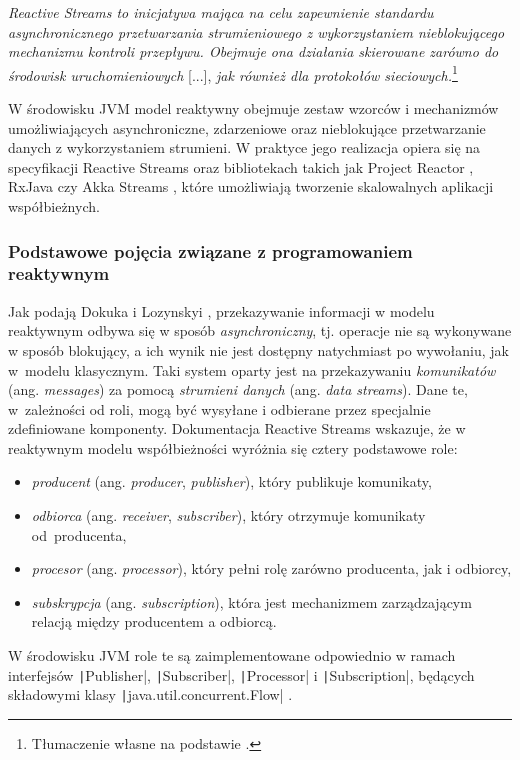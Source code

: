\begin{displayquote}
    \emph{Reactive Streams to inicjatywa mająca na celu zapewnienie standardu asynchronicznego przetwarzania strumieniowego z wykorzystaniem nieblokującego mechanizmu kontroli przepływu. Obejmuje ona działania skierowane zarówno do środowisk uruchomieniowych} [...], \emph{jak również dla protokołów sieciowych.}\footnote{Tłumaczenie własne na podstawie \cite{reactive-streams-page}.}
\end{displayquote}

W środowisku JVM model reaktywny obejmuje zestaw wzorców i mechanizmów umożliwiających asynchroniczne, zdarzeniowe oraz nieblokujące przetwarzanie danych z wykorzystaniem strumieni. W praktyce jego realizacja opiera się na specyfikacji Reactive Streams oraz bibliotekach takich jak Project Reactor \cite{project-reactor-page}, RxJava \cite{rx-java-page} czy Akka Streams \cite{akka-streams-page}, które umożliwiają tworzenie skalowalnych aplikacji współbieżnych.

\subsubsection{Podstawowe pojęcia związane z programowaniem reaktywnym}

Jak podają Dokuka i Lozynskyi \cite{dokuka2018}, przekazywanie informacji w modelu reaktywnym odbywa się w sposób \emph{asynchroniczny}, tj. operacje nie są wykonywane w sposób blokujący, a ich wynik nie jest dostępny natychmiast po wywołaniu, jak w~modelu klasycznym. Taki system oparty jest na przekazywaniu \emph{komunikatów} (ang. \emph{messages}) za pomocą \emph{strumieni danych} (ang. \emph{data streams}). Dane te, w~zależności od roli, mogą być wysyłane i odbierane przez specjalnie zdefiniowane komponenty. Dokumentacja Reactive Streams \cite{reactive-streams-page} wskazuje, że w reaktywnym modelu współbieżności wyróżnia się cztery podstawowe role:
\begin{itemize}
    \item \emph{producent} (ang. \emph{producer}, \emph{publisher}), który publikuje komunikaty,
    \item \emph{odbiorca} (ang. \emph{receiver}, \emph{subscriber}), który otrzymuje komunikaty od~producenta,
    \item \emph{procesor} (ang. \emph{processor}), który pełni rolę zarówno producenta, jak i odbiorcy,
    \item \emph{subskrypcja} (ang. \emph{subscription}), która jest mechanizmem zarządzającym relacją między producentem a odbiorcą.
\end{itemize}
W środowisku JVM role te są zaimplementowane odpowiednio w ramach interfejsów \texttt|Publisher|, \texttt|Subscriber|, \texttt|Processor| i \texttt|Subscription|, będących składowymi klasy \texttt|java.util.concurrent.Flow| \cite{java-flow}.

